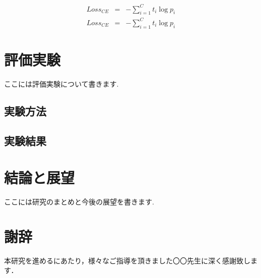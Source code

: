 \documentclass[12pt,a4j]{jreport}
\begin{document}
\begin{eqnarray}
  Loss_{CE} & = & -\sum_{i=1}^C t_i\log p_i\\
  Loss_{CE} & = & -\sum_{i=1}^C t_i\log p_i
\end{eqnarray}



\chapter{評価実験}
ここには評価実験について書きます.
\section{実験方法}
\section{実験結果}



\chapter{結論と展望}
ここには研究のまとめと今後の展望を書きます.


\chapter*{謝辞} %
本研究を進めるにあたり，様々なご指導を頂きました〇〇先生に深く感謝致します．

\end{document}

